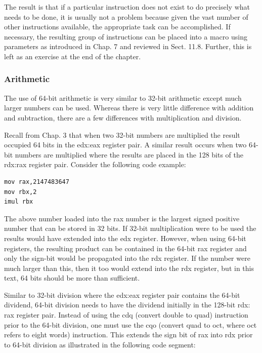 \documentclass[10pt]{article}
\begin{document}
The result is that if a particular instruction does not exist to do precisely what needs to be done, it is usually not a problem because given the vast number of other instructions available, the appropriate task can be accomplished. If necessary, the resulting group of instructions can be placed into a macro using parameters as introduced in Chap. 7 and reviewed in Sect. 11.8. Further, this is left as an exercise at the end of the chapter.

\subsubsection*{Arithmetic}
The use of 64-bit arithmetic is very similar to 32-bit arithmetic except much larger numbers can be used. Whereas there is very little difference with addition and subtraction, there are a few differences with multiplication and division.

Recall from Chap. 3 that when two 32-bit numbers are multiplied the result occupied 64 bits in the edx:eax register pair. A similar result occurs when two 64-bit numbers are multiplied where the results are placed in the 128 bits of the rdx:rax register pair. Consider the following code example:

\begin{verbatim}
mov rax,2147483647
mov rbx,2
imul rbx
\end{verbatim}

The above number loaded into the rax number is the largest signed positive number that can be stored in 32 bits. If 32-bit multiplication were to be used the results would have extended into the edx register. However, when using 64-bit registers, the resulting product can be contained in the 64-bit rax register and only the sign-bit would be propagated into the rdx register. If the number were much larger than this, then it too would extend into the rdx register, but in this text, 64 bits should be more than sufficient.

Similar to 32-bit division where the edx:eax register pair contains the 64-bit dividend, 64-bit division needs to have the dividend initially in the 128-bit rdx:\\
rax register pair. Instead of using the cdq (convert double to quad) instruction prior to the 64-bit division, one must use the cqo (convert quad to oct, where oct refers to eight words) instruction. This extends the sign bit of rax into rdx prior to 64-bit division as illustrated in the following code segment:
\end{document}

